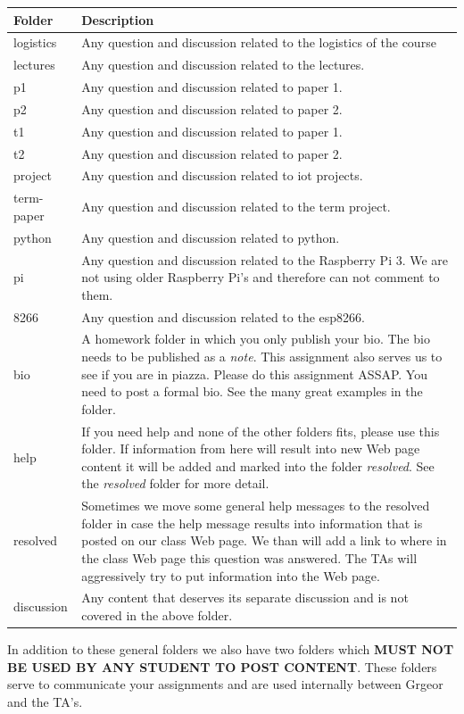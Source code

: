 \begin{tabular}{p{2cm}p{11cm}}
Folder & Description \\
\toprule
logistics &
Any question and discussion related to the logistics of the course
\\
lectures &
Any question and discussion related to the lectures.
\\
p1 &
Any question and discussion related to paper 1.
\\
p2 &
Any question and discussion related to paper 2.
\\
t1 &
Any question and discussion related to paper 1.
\\
t2 &
Any question and discussion related to paper 2.
\\
project &
Any question and discussion related to iot projects.
\\
term-paper &
Any question and discussion related to the term project.
\\
python &
Any question and discussion related to python.
\\
pi &
Any question and discussion related to the Raspberry Pi 3. We are not
using older Raspberry Pi's and therefore can not comment to them.
\\
8266 &
Any question and discussion related to the esp8266.
\\
bio &
A homework folder in which you only publish your bio. The bio needs to
be published as a \emph{note}. This assignment also serves us to see if
you are in piazza. Please do this assignment ASSAP. You need to post a
formal bio. See the many great examples in the folder.
\\
help &
If you need help and none of the other folders fits, please use this
folder. If information from here will result into new Web page content
it will be added and marked into the folder \emph{resolved}. See the
\emph{resolved} folder for more detail.
\\
resolved &
Sometimes we move some general help messages to the resolved folder in
case the help message results into information that is posted on our
class Web page. We than will add a link to where in the class Web page
this question was answered. The TAs will aggressively try to put
information into the Web page.
\\
discussion &
Any content that deserves its separate discussion and is not covered in
the above folder. \\
\bottomrule
\end{tabular}

In addition to these general folders we also have two folders which
\textbf{MUST NOT BE USED BY ANY STUDENT TO POST CONTENT}. These folders
serve to communicate your assignments and are used internally between
Grgeor and the TA's.

